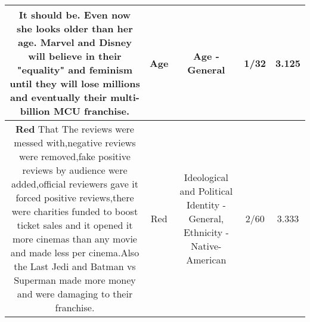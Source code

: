 \documentclass[11pt]{article}
\newlength\mylength
\begin{document}
\begin{center}
\begin{longtable}{|C{.65\mylength}|C{.30\mylength}|C{.12\mylength}|C{.12\mylength}|C{.12\mylength}|}
  \small It should be. Even now she looks older than her \textbf{age}. Marvel and Disney will believe in their "equality" and feminism until they will lose millions and eventually their multi-billion MCU franchise.\normalsize   & Age & Age - General & 1/32 & 3.125 \\  \hline
  \small \@\textbf{R\textbf{ed}} That The reviews were messed with,negative reviews were removed,fake positive reviews by audience were added,official reviewers gave it forced positive reviews,there were charities funded to boost ticket sales and it opened it more cinemas than any movie and made less per cinema.Also the Last Jedi and Batman vs Superman made more money and were damaging to their franchise.\normalsize   & Red &  Ideological and Political Identity - General, Ethnicity - Native-American & 2/60 & 3.333 \\  \hline
  
\end{longtable}
\end{center}
\end{document}
